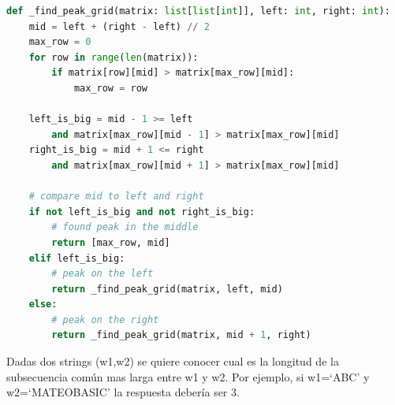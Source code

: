\documentclass[12pt, a4paper]{exam}
\begin{document}
\begin{questions}
\begin{lstlisting}[language=Python]
def _find_peak_grid(matrix: list[list[int]], left: int, right: int):
	mid = left + (right - left) // 2
	max_row = 0
	for row in range(len(matrix)):
		if matrix[row][mid] > matrix[max_row][mid]:
			max_row = row

	left_is_big = mid - 1 >= left 
        and matrix[max_row][mid - 1] > matrix[max_row][mid]
	right_is_big = mid + 1 <= right 
        and matrix[max_row][mid + 1] > matrix[max_row][mid]

	# compare mid to left and right
	if not left_is_big and not right_is_big: 
        # found peak in the middle
		return [max_row, mid]
	elif left_is_big:  
        # peak on the left
		return _find_peak_grid(matrix, left, mid)
	else: 
        # peak on the right
		return _find_peak_grid(matrix, mid + 1, right)

\end{lstlisting}
	\question 
    Dadas dos strings (w1,w2) se quiere conocer cual es la longitud de la subsecuencia
    común mas larga entre w1 y w2. Por ejemplo, si w1=`ABC' y w2=`MATEOBASIC' la respuesta
    debería ser 3. 
    \begin{parts}


\end{parts}
\end{questions}
\end{document}

